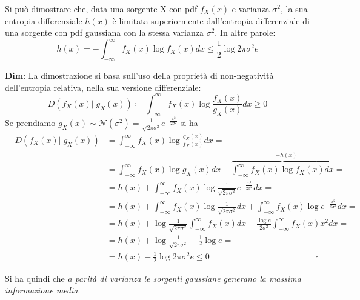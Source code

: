 Si pu\`o dimostrare che, data una sorgente X con pdf $f_X(x)$ e varianza $\sigma^2$, la sua entropia differenziale $h(x)$ \`e limitata superiormente dall'entropia differenziale di una sorgente con pdf gaussiana con la stessa varianza $\sigma^2$. In altre parole:
\begin{equation}
    h(x) = - \int_{-\infty}^\infty f_X(x) \log f_X(x) dx \leq \frac{1}{2} \log 2\pi \sigma^2 e
\end{equation}
\begin{tcolorbox}
\textbf{Dim}: La dimostrazione si basa sull'uso della propriet\`a di non-negativit\`a dell'entropia relativa, nella sua versione differenziale:
\begin{equation}
    D(f_X(x) || g_X(x)) \coloneqq \int_{-\infty}^{\infty} f_X(x) \log \frac{f_X(x)}{g_X(x)} dx \geq 0
\end{equation}
Se prendiamo $g_X(x) \sim \mathcal{N}(\sigma^2) = \frac{1}{\sqrt{2 \pi \sigma^2}} e^{-\frac{x^2}{2\sigma^2}}$ si ha
\begin{align*}
-D(f_X(x) || g_X(x)) &= \int_{-\infty}^{\infty} f_X(x) \log \frac{g_X(x)}{f_X(x)} dx = \\
&= \int_{-\infty}^{\infty} f_X(x) \log g_X(x) dx - \overbrace{\int_{-\infty}^{\infty} f_X(x) \log f_X(x) dx}^{=-h(x)} = \\
&= h(x) + \int_{-\infty}^{\infty} f_X(x) \log \frac{1}{\sqrt{2 \pi \sigma^2}} e^{-\frac{x^2}{2\sigma^2}} dx = 
\\
&= h(x) + \int_{-\infty}^{\infty} f_X(x) \log \frac{1}{\sqrt{2 \pi \sigma^2}} dx + \int_{-\infty}^{\infty} f_X(x) \log e^{-\frac{x^2}{2\sigma^2}} dx = \\
&= h(x) + \log \frac{1}{\sqrt{2 \pi \sigma^2}} \int_{-\infty}^{\infty} f_X(x) dx - \frac{\log e}{2\sigma^2} \int_{-\infty}^{\infty} f_X(x) x^2 dx = \\ 
&= h(x) + \log \frac{1}{\sqrt{2 \pi \sigma^2}} - \frac{1}{2} \log e = \\
&= h(x) - \frac{1}{2} \log 2\pi \sigma^2 e \leq 0 \hspace{150pt} \square
\end{align*}
\end{tcolorbox}
Si ha quindi che \textit{a parit\`a di varianza le sorgenti gaussiane generano la massima informazione media}.